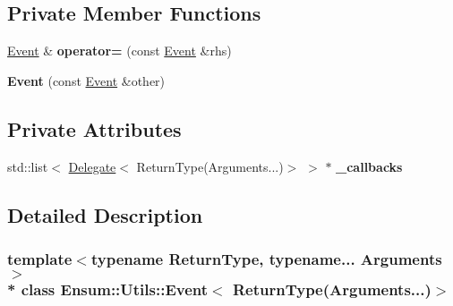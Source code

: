 \subsection*{Private Member Functions}
\begin{DoxyCompactItemize}
\item 
\hyperlink{class_ensum_1_1_utils_1_1_event}{Event} \& {\bfseries operator=} (const \hyperlink{class_ensum_1_1_utils_1_1_event}{Event} \&rhs)\hypertarget{class_ensum_1_1_utils_1_1_event_3_01_return_type_07_arguments_8_8_8_08_4_a8a2c73ebb55687bce62f712ab44b9824}{}\label{class_ensum_1_1_utils_1_1_event_3_01_return_type_07_arguments_8_8_8_08_4_a8a2c73ebb55687bce62f712ab44b9824}

\item 
{\bfseries Event} (const \hyperlink{class_ensum_1_1_utils_1_1_event}{Event} \&other)\hypertarget{class_ensum_1_1_utils_1_1_event_3_01_return_type_07_arguments_8_8_8_08_4_a9eb1b82ae773dec28eb4fc16890cc63e}{}\label{class_ensum_1_1_utils_1_1_event_3_01_return_type_07_arguments_8_8_8_08_4_a9eb1b82ae773dec28eb4fc16890cc63e}

\end{DoxyCompactItemize}
\subsection*{Private Attributes}
\begin{DoxyCompactItemize}
\item 
std\+::list$<$ \hyperlink{class_ensum_1_1_utils_1_1_delegate}{Delegate}$<$ Return\+Type(Arguments...)$>$ $>$ $\ast$ {\bfseries \+\_\+callbacks}\hypertarget{class_ensum_1_1_utils_1_1_event_3_01_return_type_07_arguments_8_8_8_08_4_a05d7b577e977fef2e82c806106127ee8}{}\label{class_ensum_1_1_utils_1_1_event_3_01_return_type_07_arguments_8_8_8_08_4_a05d7b577e977fef2e82c806106127ee8}

\end{DoxyCompactItemize}


\subsection{Detailed Description}
\subsubsection*{template$<$typename Return\+Type, typename... Arguments$>$\\*
class Ensum\+::\+Utils\+::\+Event$<$ Return\+Type(\+Arguments...)$>$}

